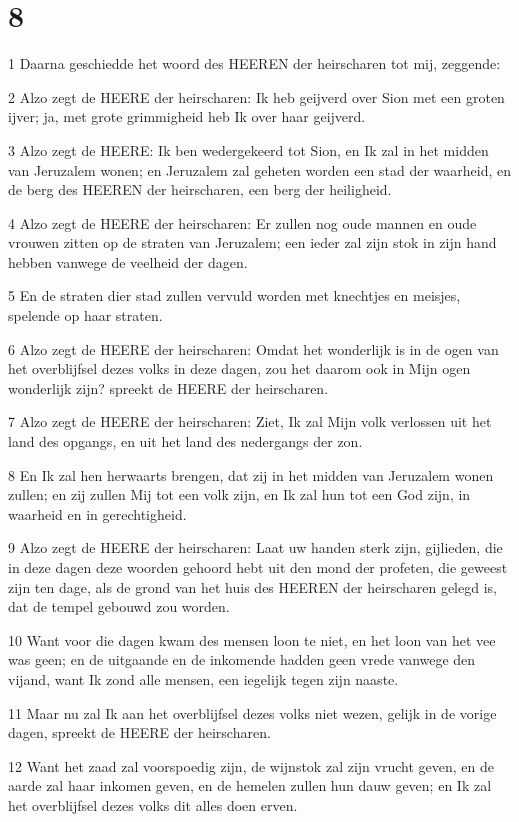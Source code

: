 \chapter{8}

\par 1 Daarna geschiedde het woord des HEEREN der heirscharen tot mij, zeggende:
\par 2 Alzo zegt de HEERE der heirscharen: Ik heb geijverd over Sion met een groten ijver; ja, met grote grimmigheid heb Ik over haar geijverd.
\par 3 Alzo zegt de HEERE: Ik ben wedergekeerd tot Sion, en Ik zal in het midden van Jeruzalem wonen; en Jeruzalem zal geheten worden een stad der waarheid, en de berg des HEEREN der heirscharen, een berg der heiligheid.
\par 4 Alzo zegt de HEERE der heirscharen: Er zullen nog oude mannen en oude vrouwen zitten op de straten van Jeruzalem; een ieder zal zijn stok in zijn hand hebben vanwege de veelheid der dagen.
\par 5 En de straten dier stad zullen vervuld worden met knechtjes en meisjes, spelende op haar straten.
\par 6 Alzo zegt de HEERE der heirscharen: Omdat het wonderlijk is in de ogen van het overblijfsel dezes volks in deze dagen, zou het daarom ook in Mijn ogen wonderlijk zijn? spreekt de HEERE der heirscharen.
\par 7 Alzo zegt de HEERE der heirscharen: Ziet, Ik zal Mijn volk verlossen uit het land des opgangs, en uit het land des nedergangs der zon.
\par 8 En Ik zal hen herwaarts brengen, dat zij in het midden van Jeruzalem wonen zullen; en zij zullen Mij tot een volk zijn, en Ik zal hun tot een God zijn, in waarheid en in gerechtigheid.
\par 9 Alzo zegt de HEERE der heirscharen: Laat uw handen sterk zijn, gijlieden, die in deze dagen deze woorden gehoord hebt uit den mond der profeten, die geweest zijn ten dage, als de grond van het huis des HEEREN der heirscharen gelegd is, dat de tempel gebouwd zou worden.
\par 10 Want voor die dagen kwam des mensen loon te niet, en het loon van het vee was geen; en de uitgaande en de inkomende hadden geen vrede vanwege den vijand, want Ik zond alle mensen, een iegelijk tegen zijn naaste.
\par 11 Maar nu zal Ik aan het overblijfsel dezes volks niet wezen, gelijk in de vorige dagen, spreekt de HEERE der heirscharen.
\par 12 Want het zaad zal voorspoedig zijn, de wijnstok zal zijn vrucht geven, en de aarde zal haar inkomen geven, en de hemelen zullen hun dauw geven; en Ik zal het overblijfsel dezes volks dit alles doen erven.
